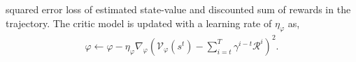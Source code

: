 \documentclass[letterpaper]{article} %
\newcommand\red[1]{\textcolor{red}{#1}}
\newcommand\rjf[1]{\textcolor{red}{\{RJF: #1\}}}
\newcommand\yxy[1]{\textcolor{blue}{\{YXY: #1\}}}
\begin{document}
squared error loss of estimated state-value and discounted sum of rewards in the trajectory. 
The critic model is updated with a learning rate of $\eta_{\varphi}$ as,
\begin{align}
\label{eqn:critic_gradient}
\varphi \leftarrow \varphi-\eta_{\varphi}\nabla_\varphi(\mathcal{V}_\varphi\left(s^t\right)-\sum_{i=t}^T \gamma^{i-t} \mathcal{R}^i)^2. 
\end{align}
\end{document}
